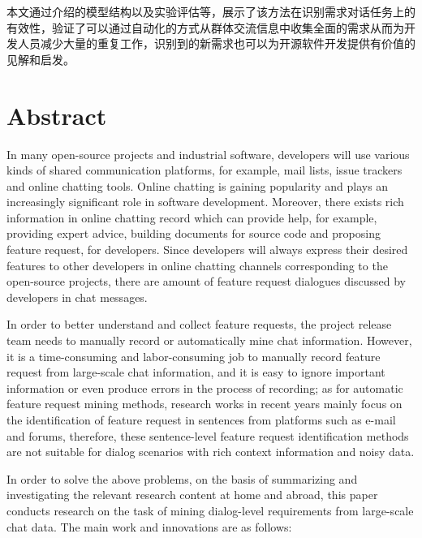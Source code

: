 本文通过介绍{\tool}的模型结构以及实验评估等，展示了该方法在识别需求对话任务上的有效性，验证了{\tool}可以通过自动化的方式从群体交流信息中收集全面的需求从而为开发人员减少大量的重复工作，识别到的新需求也可以为开源软件开发提供有价值的见解和启发。


\intobmk\chapter*{Abstract}%
In many open-source projects and industrial software, developers will use various kinds of shared communication platforms, for example, mail lists, issue trackers and online chatting tools. 
Online chatting is gaining popularity and plays an increasingly significant role in software development. Moreover, there exists rich information in online chatting record which can provide help, for example, providing expert advice, building documents for source code and proposing feature request, for developers. Since developers will always express their desired features to other developers in online chatting channels corresponding to the open-source projects, there are amount of feature request dialogues discussed by developers in chat messages.

In order to better understand and collect feature requests, the project release team needs to manually record or automatically mine chat information. However, it is a time-consuming and labor-consuming job to manually record feature request from large-scale chat information, and it is easy to ignore important information or even produce errors in the process of recording; as for automatic feature request mining methods, research works in recent years mainly focus on the identification of feature request in sentences from platforms such as e-mail and forums, therefore, these sentence-level feature request identification methods are not suitable for dialog scenarios with rich context information and noisy data.

In order to solve the above problems, on the basis of summarizing and investigating the relevant research content at home and abroad, this paper conducts research on the task of mining dialog-level requirements from large-scale chat data. The main work and innovations are as follows:

